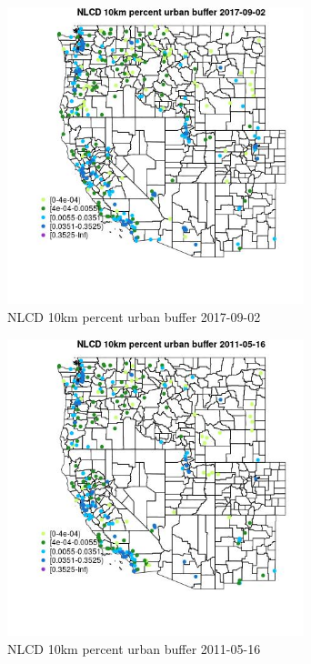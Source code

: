 \begin{figure} 
\centering  
\includegraphics[width=0.77\textwidth]{Code_Outputs/Report_ML_input_PM25_Step4_part_e_de_duplicated_aves_compiled_2019-05-21wNAs_MapObsNLCD_10km_percent_urban_buffer2017-09-02.jpg} 
\caption{\label{fig:Report_ML_input_PM25_Step4_part_e_de_duplicated_aves_compiled_2019-05-21wNAsMapObsNLCD_10km_percent_urban_buffer2017-09-02}NLCD 10km percent urban buffer 2017-09-02} 
\end{figure} 
 

\begin{figure} 
\centering  
\includegraphics[width=0.77\textwidth]{Code_Outputs/Report_ML_input_PM25_Step4_part_e_de_duplicated_aves_compiled_2019-05-21wNAs_MapObsNLCD_10km_percent_urban_buffer2011-05-16.jpg} 
\caption{\label{fig:Report_ML_input_PM25_Step4_part_e_de_duplicated_aves_compiled_2019-05-21wNAsMapObsNLCD_10km_percent_urban_buffer2011-05-16}NLCD 10km percent urban buffer 2011-05-16} 
\end{figure} 
 

